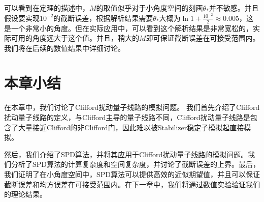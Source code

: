 可以看到在定理的描述中，$M$的取值似乎对于小角度空间的刻画$\theta_*$并不敏感。并且假设要实现$10^{-2}$的截断误差，根据解析结果需要$\theta_*$大概为$\ln 1+\frac{10^{-2}}{2} \approx 0.005$，这是一个非常小的角度。但在实际应用中，可以看到这个解析结果是非常宽松的，实际可用的角度远大于这个值。并且，稍大的$M$即可保证截断误差在可接受范围内。我们将在后续的数值结果中详细讨论。

\section{本章小结}
在本章中，我们讨论了Clifford扰动量子线路的模拟问题。
我们首先介绍了Clifford扰动量子线路的定义，与Clifford主导的量子线路不同，Clifford扰动量子线路是包含了大量接近Clifford的非Clifford门，因此难以被Stabilizer稳定子模拟起直接模拟。

然后，我们介绍了SPD算法，并将其应用于Clifford扰动量子线路的模拟问题。我们分析了SPD算法的计算复杂度和空间复杂度，并讨论了截断误差的上界。最后，我们证明了在小角度空间中，SPD算法可以提供高效的近似期望值，并且可以保证截断误差和均方误差在可接受范围内。在下一章中，我们将通过数值实验验证我们的理论结果。